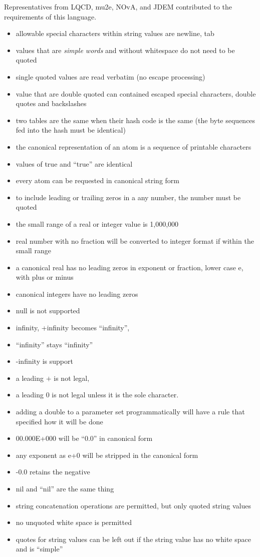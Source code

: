 \documentclass{memarticle}
\begin{document}
	Representatives from LQCD, mu2e, NOvA, and JDEM contributed to the requirements 
	of this language.

	\begin{itemize}
	\item allowable special characters within string values are newline, tab
	\item values that are \emph{simple words} and without whitespace do not need to be quoted
	\item single quoted values are read verbatim (no escape processing)
	\item value that are double quoted can contained escaped special characters, double quotes and backslashes
	\item two tables are the same when their hash code is the same (the byte sequences fed into the hash must be identical)
	\item the canonical representation of an atom is a sequence of printable characters
	\item values of true and ``true'' are identical
	\item every atom can be requested in canonical string form
	\item to include leading or trailing zeros in a any number, the number must be quoted
	\item the small range of a real or integer value is 1,000,000
	\item real number with no fraction will be converted to integer format if within the small range
	\item a canonical real has no leading zeros in exponent or fraction, lower case e, with plus or minus
	\item canonical integers have no leading zeros
	\item null is not supported
	\item infinity, +infinity becomes ``infinity'', 
	\item ``infinity'' stays ``infinity''
	\item -infinity is support
	\item a leading $+$ is not legal,
	\item a leading 0 is not legal unless it is the sole character.
	\item adding a double to a parameter set programmatically will have a rule that specified how it will be done
	\item 00.000E+000 will be ``0.0'' in canonical form
	\item any exponent as e+0 will be stripped in the canonical form
	\item -0.0 retains the negative
	\item nil and ``nil'' are the same thing
	\item string concatenation operations are permitted, but only quoted string values
	\item no unquoted white space is permitted
	\item quotes for string values can be left out if the string value has no white space and is ``simple''
	\end{itemize}
	
\end{document}
